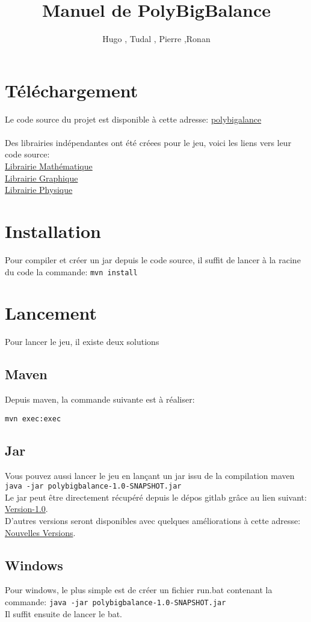 \documentclass[11pt]{article}
\title{Manuel de PolyBigBalance}
\author{Hugo \bsc{Pigeon}, Tudal \bsc{Lebot}, Pierre \bsc{Pétillon},Ronan \bsc{Jamet}}
\begin{document}
	\maketitle

	\section{Téléchargement}
		
		Le code source du projet est disponible à cette adresse: \href{https://gitlab.univ-nantes.fr/E133567G/poly-big-balance/tree/master/}{polybigalance}\\
		\\
		Des librairies indépendantes ont été créees pour le jeu, voici les liens vers leur code source:\\
		\href{https://gitlab.univ-nantes.fr/ronan/coraMaths/tree/master}{Librairie Mathématique}\\
		\href{https://gitlab.univ-nantes.fr/ronan/coraGraphics/tree/master}{Librairie Graphique}\\
		\href{https://gitlab.univ-nantes.fr/ronan/coraPhysics/tree/master}{Librairie Physique}\\
	

	\section{Installation}
	
		Pour compiler et créer un jar depuis le code source, il suffit de lancer à la racine du code la commande:
		\verb|mvn install|
	
	\section{Lancement}
		Pour lancer le jeu, il existe deux solutions
		
		\subsection{Maven}
		Depuis maven, la commande suivante est à réaliser:
		
		\verb|mvn exec:exec|
		
		\subsection{Jar}
		Vous pouvez aussi lancer le jeu en lançant un jar issu de la compilation maven\\
		\verb|java -jar polybigbalance-1.0-SNAPSHOT.jar|\\
		Le jar peut être directement récupéré depuis le dépos gitlab grâce au lien suivant: 
		\href{https://gitlab.univ-nantes.fr/E133567G/poly-big-balance/tree/master/polybigbalance/polybigbalance-1.0/SNAPSHOT}{Version-1.0}.\\
		D'autres versions seront disponibles avec quelques améliorations à cette adresse:\\ \href{https://gitlab.univ-nantes.fr/E133567G/poly-big-balance/tree/master/polybigbalance/}{Nouvelles Versions}.\\
		
		\subsection{Windows}
		Pour windows, le plus simple est de créer un fichier run.bat contenant la commande: \verb|java -jar polybigbalance-1.0-SNAPSHOT.jar|\\
		Il suffit ensuite de lancer le bat.
		
\end{document}
